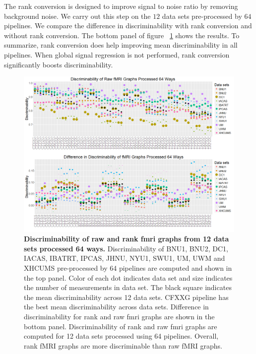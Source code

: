 \documentclass{article}
\begin{document}
The rank conversion is designed to improve signal to noise ratio by removing background noise. We carry out this step on the $12$ data sets pre-processed by $64$ pipelines. We compare the difference in discriminability with rank conversion and without rank conversion. The bottom panel of figure ~\ref{fig:pipes} shows the results. To summarize, rank conversion does help improving mean discriminability in all pipelines. When global signal regression is not performed, rank conversion significantly boosts discriminability. 
\newpage
\begin{figure}[H]
	\includegraphics[width=\linewidth]{../Figs/comb_mri.png}
	\caption{{\bf Discriminability of raw and rank fmri graphs from 12 data sets processed 64 ways.}  Discriminability of BNU1, BNU2, DC1, IACAS, IBATRT, IPCAS, JHNU, NYU1, SWU1, UM, UWM and XHCUMS pre-processed by 64 pipelines are computed and shown in the top panel. Color of each dot indicates data set and size indicates the number of measurements in data set. The black square indicates the mean discriminability across 12 data sets. CFXXG pipeline has the best mean discriminability across data sets. 
	Difference in discriminability for rank and raw fmri graphs are shown in the bottom panel. Discriminability of  rank and raw fmri graphs are computed for 12 data sets processed using 64 pipelines. Overall, rank fMRI graphs are more discriminable than raw fMRI graphs.}
	\label{fig:pipes}
\end{figure}
\end{document}
